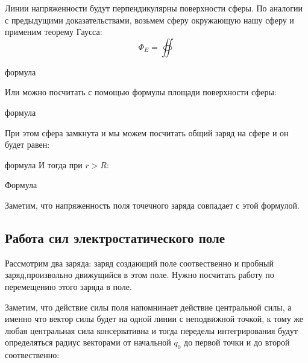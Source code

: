 \documentclass[../main.tex]{subfiles}
\begin{document}
Линии напряженности будут перпендикулярны поверхности сферы.
По аналогии с предыдущими доказательствами, возьмем сферу окружающую нашу сферу и применим теорему Гаусса:
\[\Phi_E = \oiint\]

формула

Или можно посчитать с помощью формулы площади поверхности сферы:

формула

При этом сфера замкнута и мы можем посчитать общий заряд на сфере и он будет равен:

формула
И тогда при $r > R$:

Формула

Заметим, что напряженность поля точечного заряда совпадает с этой формулой.

\subsection{Работа сил электростатического поле}

Рассмотрим два заряда: заряд создающий поле соотвественно и пробный заряд,произвольно движущийся в этом поле. Нужно посчитать работу по перемещению этого заряда в поле.

Заметим, что действие силы поля напомнинает действие центральной силы, а именно что вектор силы будет на одной линии с неподвижной точкой, к тому же любая центральная сила консервативна и тогда переделы интегрирования будут определяться радиус векторами от начальной $q_0$ до первой точки и до второй соотвественно:
\end{document}
